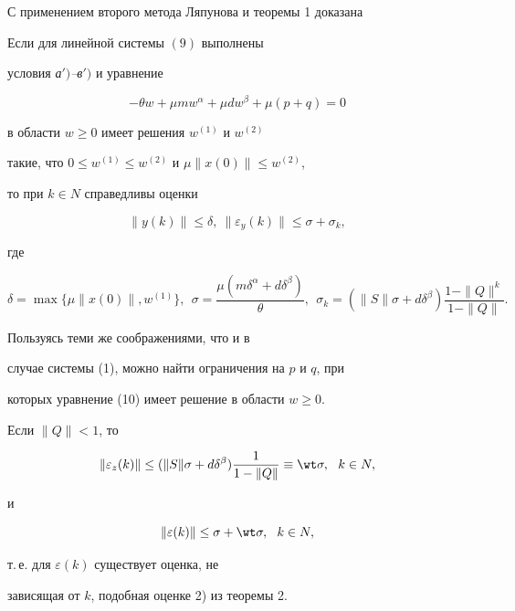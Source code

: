 С применением второго метода Ляпунова и теоремы 1 доказана





\begin{thm}


Если для линейной системы $(9)$ выполнены


условия {\em а$')$--в$')$} и уравнение


\begin{equation}


-\theta w+\mu mw^{\alpha}+\mu dw^{\beta}+\mu(p+q)=0


\end{equation}


в области $w\ge0$ имеет решения $w^{(1)}$  и $w^{(2)}$


такие, что $0\le w^{(1)}\le w^{(2)}$ и $\mu\|x(0)\|\le w^{(2)}$,


то при $k\in N$ справедливы оценки


$$


\|y(k)\|\le\delta,\ \|\varepsilon_y(k)\|\le\sigma+\sigma_k,


$$


где


$$


\delta=\max\{\mu\|x(0)\|,w^{(1)}\},\ \


\sigma=\frac{\mu(m\delta^{\alpha}+d\delta^{\beta})}{\theta},\ \


\sigma_k=(\|S\|\sigma+d\delta^{\beta})\frac{1-\|Q\|^k}{1-\|Q\|}.


$$


\end{thm}





\begin{note}


Пользуясь теми же соображениями, что и в


случае системы (1), можно найти ограничения на $p$ и $q$, при


которых уравнение (10) имеет решение в области $w\ge0$.


\end{note}





\begin{note}


Если $\|Q\|<1$, то


$$


\|\varepsilon_z(k)\|\le(\|S\|\sigma+d\delta^{\beta})\frac1{1-\|Q\|}\equiv\wt


\sigma,\ \ k\in N,


$$


и


$$


\|\varepsilon(k)\|\le\sigma+\wt\sigma,\ \ k\in N,


$$


т.\,е. для $\varepsilon(k)$ существует оценка, не


зависящая от $k$, подобная оценке 2) из теоремы 2.


\end{note}





